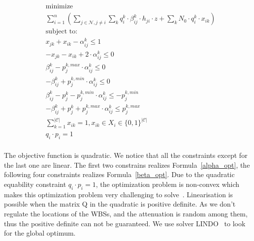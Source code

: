 	\begin{equation}
\label{midp}
			\begin{aligned}
			& \underset{}{\text{minimize}}\\
			&\sum\limits^{n}_{i=1}(\sum\limits_{j\in\mathcal{N}, j\neq i}\sum\limits_k q_{i}^k\cdot \beta_{ij}^k \cdot h_{ji}\cdot z + \sum\limits_k N_0\cdot q_{i}^k\cdot x_{ik})\\
			& \text{subject to:} \\
			& x_{jk} + x_{ik} - \alpha_{ij}^k\leq 1 \\
			& -x_{jk} - x_{ik} +2\cdot \alpha_{ij}^k \leq 0 \\
			& \beta_{ij}^k - p_j^{k,max}\cdot \alpha_{ij}^k \leq 0 \\
			& - \beta_{ij}^k + p_j^{k,min}\cdot \alpha_{ij}^k \leq 0 \\
			& \beta_{ij}^k - p_j^k - p_j^{k,min}\cdot \alpha_{ij}^k \leq -p_j^{k,min} \\			
			& -\beta_{ij}^k + p_j^k + p_j^{k,max}\cdot \alpha_{ij}^k \leq p_j^{k,max} \\			
			& \sum\limits_{k=1}^{|\mathcal{C}|}x_{ik}=1, x_{ik}\in X_i\in \{0,1\}^{|\mathcal{C}|}\\
			& q_i\cdot p_i =1\\
			\end{aligned}
		\end{equation}

The objective function is quadratic.
We notice that all the constraints except for the last one are linear.
The first two constrains realizes Formula~\ref{alpha_opt}, the following four constraints realizes Formula~\ref{beta_opt}.
Due to the quadratic equability constraint $q_i\cdot p_i =1$, the optimization problem is non-convex which makes this optimization problem very challenging to solve~\cite{hmam2010quadratic,Quadratic_min_one_equality}.
%
Linearisation is possible when the matrix Q in the quadratic is positive definite.%
As we don't regulate the locations of the WBSs, and the attenuation is random among them, thus the positive definite can not be guaranteed.
We use solver LINDO~\cite{lindo} to look for the global optimum.






